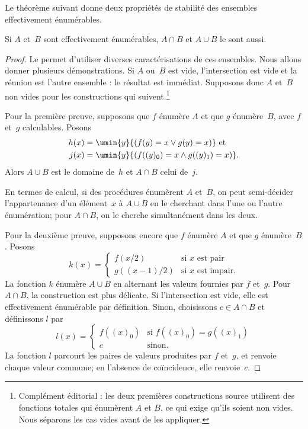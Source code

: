 \documentclass[../../../include/open-logic-section]{subfiles}
\begin{document}

Le théorème suivant donne deux propriétés de
stabilité des ensembles effectivement énumérables.

\begin{thm}
Si $A$ et~$B$ sont effectivement énumérables,
$A\cap B$ et $A\cup B$ le sont aussi.
\end{thm}

\begin{proof}
Le  permet d'utiliser
diverses caractérisations de ces ensembles.
Nous allons donner plusieurs démonstrations.
Si $A$ ou~$B$ est vide, l'intersection est vide
et la réunion est l'autre ensemble : le résultat
est immédiat. Supposons donc $A$ et~$B$ non vides
pour les constructions qui suivent.\footnote{Complément éditorial : les deux premières constructions source utilisent des fonctions totales qui énumèrent $A$ et $B$, ce qui exige qu'ils soient non vides. Nous séparons les cas vides avant de les appliquer.}

Pour la première preuve, supposons que $f$ énumère
$A$ et que $g$ énumère~$B$, avec $f$ et~$g$
calculables. Posons
\begin{align*}
h(x) & = \umin{y}{(f(y) = x \lor g(y) = x)} \text{ et}\\
j(x) & = \umin{y}{(f((y)_0) = x \land g((y)_1) = x)}.
\end{align*}
Alors $A\cup B$ est le domaine de~$h$ et
$A\cap B$ celui de~$j$.

\begin{explain}
En termes de calcul, si des procédures énumèrent
$A$ et~$B$, on peut semi-décider l'appartenance
d'un élément~$x$ à $A\cup B$ en le cherchant dans
l'une ou l'autre énumération; pour $A\cap B$, on
le cherche simultanément dans les deux.
\end{explain}

Pour la deuxième preuve, supposons encore que
$f$ énumère $A$ et que $g$ énumère~$B$. Posons
\[
k(x) = \begin{cases}
f(x/2) & \text{si $x$ est pair} \\
g((x-1)/2) & \text{si $x$ est impair.}
\end{cases}
\]
La fonction $k$ énumère $A\cup B$ en alternant
les valeurs fournies par $f$ et~$g$. Pour
$A\cap B$, la construction est plus délicate.
Si l'intersection est vide, elle est effectivement
énumérable par définition. Sinon, choisissons
$c\in A\cap B$ et définissons $l$ par
\[
l(x) = \begin{cases}
f((x)_0) & \text{si $f((x)_0) = g((x)_1)$} \\
c & \text{sinon.}
\end{cases}
\]
La fonction $l$ parcourt les paires de valeurs
produites par $f$ et~$g$, et renvoie chaque valeur
commune; en l'absence de coïncidence, elle renvoie~$c$.


\end{proof}
\end{document}
